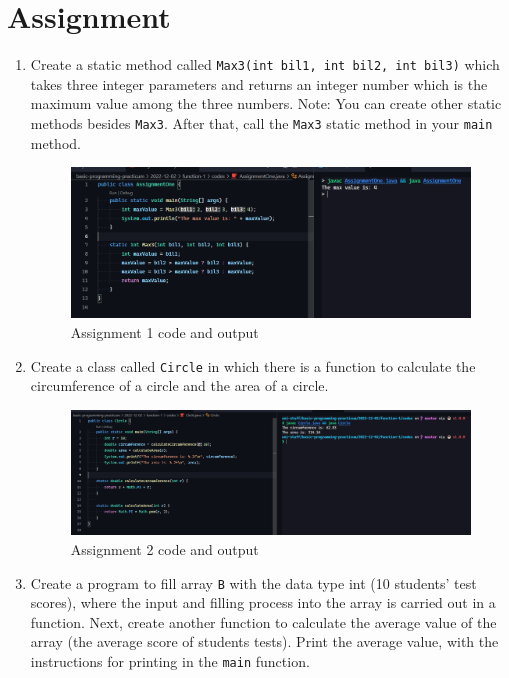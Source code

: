 \documentclass[12pt,titlepage]{article}
\begin{document}
\section{Assignment}
\begin{enumerate}
    \item {
        Create a static method called \texttt{Max3(int bil1, int bil2, int bil3)} which takes
        three integer parameters and returns an integer number which is the maximum value among
        the three numbers. Note: You can create other static methods besides \texttt{Max3}.
        After that, call the \texttt{Max3} static method in your \texttt{main} method.

        \begin{figure}[h]
            \centering
            \includegraphics[width=\textwidth]{./images/assignment-one.png}
            \caption{Assignment 1 code and output}
        \end{figure}
    }
    \item {
        Create a class called \texttt{Circle} in which there is a function to calculate the circumference
        of a circle and the area of a circle.

        \begin{figure}[h]
            \centering
            \includegraphics[width=\textwidth]{./images/assignment-two.png}
            \caption{Assignment 2 code and output}
        \end{figure}
    }
    \pagebreak
    \item {
        Create a program to fill array \texttt{B} with the data type int (10 students' test scores),
        where the input and filling process into the array is carried out in a function. Next, create
        another function to calculate the average value of the array (the average score of students tests).
        Print the average value, with the instructions for printing in the \texttt{main} function.

}
\end{enumerate}
\end{document}
